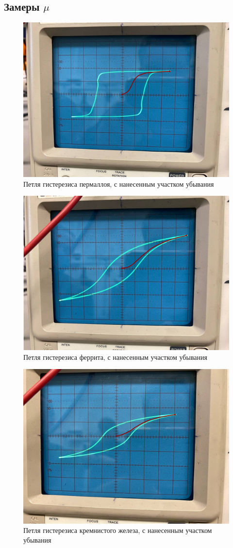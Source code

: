 \documentclass[a4paper, 12pt]{article}%
\begin{document}
	\subsection*{Замеры $\mu$}
	\begin{figure}[H]
		\centering
		\includegraphics[width=0.8\linewidth]{пермаллой}
		\caption{Петля гистерезиса пермаллоя, с нанесенным участком убывания}
		\label{fig:}
	\end{figure}
	\begin{figure}[H]
		\centering
		\includegraphics[width=0.8\linewidth]{феррит}
		\caption{Петля гистерезиса феррита, с нанесенным участком убывания}
		\label{fig:}
	\end{figure}
	\begin{figure}[H]
		\centering
		\includegraphics[width=0.8\linewidth]{"кремнистое железо"}
		\caption{Петля гистерезиса кремнистого железа, с нанесенным участком убывания}
		\label{fig:-}
	\end{figure}
\end{document}
